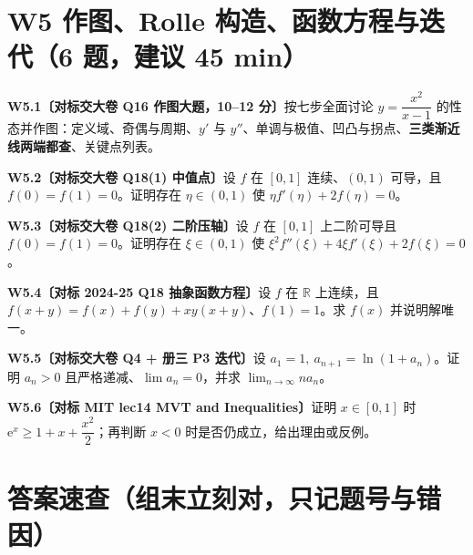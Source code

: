 \documentclass[11pt,a4paper]{ctexart}
\newcommand{\R}{\mathbb{R}}
\newcommand{\ee}{\mathrm{e}}
\newcommand{\Q}[2]{\par\medskip\noindent\textbf{#1}\quad #2\par}
\begin{document}
\newpage
\section{W5 作图、Rolle 构造、函数方程与迭代（6 题，建议 45 min）}

\Q{W5.1〔对标交大卷 Q16 作图大题，10--12 分〕}{按七步全面讨论 $y=\dfrac{x^2}{x-1}$ 的性态并作图：定义域、奇偶与周期、$y'$ 与 $y''$、单调与极值、凹凸与拐点、\textbf{三类渐近线两端都查}、关键点列表。}
\Q{W5.2〔对标交大卷 Q18(1) 中值点〕}{设 $f$ 在 $[0,1]$ 连续、$(0,1)$ 可导，且 $f(0)=f(1)=0$。证明存在 $\eta\in(0,1)$ 使 $\eta f'(\eta)+2f(\eta)=0$。}
\Q{W5.3〔对标交大卷 Q18(2) 二阶压轴〕}{设 $f$ 在 $[0,1]$ 上二阶可导且 $f(0)=f(1)=0$。证明存在 $\xi\in(0,1)$ 使
$\xi^2f''(\xi)+4\xi f'(\xi)+2f(\xi)=0$。}
\Q{W5.4〔对标 2024-25 Q18 抽象函数方程〕}{设 $f$ 在 $\R$ 上连续，且 $f(x+y)=f(x)+f(y)+xy(x+y)$、$f(1)=1$。求 $f(x)$ 并说明解唯一。}
\Q{W5.5〔对标交大卷 Q4 + 册三 P3 迭代〕}{设 $a_1=1,\ a_{n+1}=\ln(1+a_n)$。证明 $a_n>0$ 且严格递减、$\lim a_n=0$，并求 $\lim_{n\to\infty}n a_n$。}
\Q{W5.6〔对标 MIT lec14 MVT and Inequalities〕}{证明 $x\in[0,1]$ 时 $\ee^x\ge1+x+\dfrac{x^2}{2}$；再判断 $x<0$ 时是否仍成立，给出理由或反例。}

\section{答案速查（组末立刻对，只记题号与错因）}
\end{document}

